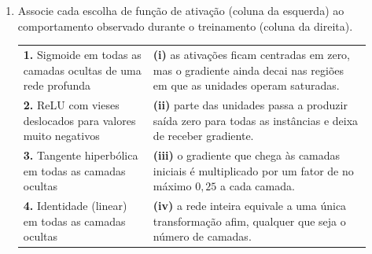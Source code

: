 \documentclass{dlproblemset}
\begin{document}
\begin{enumerate}[1)]
    \begin{enumerate}[(a)]
        \item $\mathcal{L} = \displaystyle\sum_{i=1}^{N} \left[ \bigl(y^{(i)} - \mu^{(i)}\bigr)^2 + \ln\bigl|\cos(y^{(i)} - \mu^{(i)})\bigr| \right]$
        \item $\mathcal{L} = \displaystyle\sum_{i=1}^{N} \left[ \bigl(y^{(i)} - \mu^{(i)}\bigr)^2 - \ln\bigl|\cos(y^{(i)} - \mu^{(i)})\bigr| \right]$
        \item $\mathcal{L} = \displaystyle\sum_{i=1}^{N} \left[ \frac{\bigl(y^{(i)} - \mu^{(i)}\bigr)^2}{2\sigma^2} - \ln\bigl|\cos(y^{(i)} - \mu^{(i)})\bigr| \right]$
        \item $\mathcal{L} = \displaystyle\sum_{i=1}^{N} \left[ -\bigl(y^{(i)} - \mu^{(i)}\bigr)^2 - \ln\bigl|\cos(y^{(i)} - \mu^{(i)})\bigr| \right]$
        \item $\mathcal{L} = \displaystyle\sum_{i=1}^{N} \left[ \bigl(y^{(i)} - \mu^{(i)}\bigr)^2 \cdot \ln\bigl|\cos(y^{(i)} - \mu^{(i)})\bigr| \right]$
        \item $\mathcal{L} = \displaystyle\sum_{i=1}^{N} \left[ \bigl(y^{(i)} - \mu^{(i)}\bigr)^2 - \bigl|\cos(y^{(i)} - \mu^{(i)})\bigr| \right]$
        \item $\mathcal{L} = \displaystyle\sum_{i=1}^{N} \left[ \bigl(y^{(i)} - \mu^{(i)}\bigr)^2 - \ln\bigl|\cos(\mu^{(i)})\bigr| \right]$
        \item $\mathcal{L} = -\displaystyle\sum_{i=1}^{N} \left[ \bigl(y^{(i)} - \mu^{(i)}\bigr)^2 - \ln\bigl|\cos(y^{(i)} - \mu^{(i)})\bigr| \right]$
    \end{enumerate}

    \item Associe cada escolha de função de ativação (coluna da esquerda) ao comportamento observado durante o treinamento (coluna da direita).

    \begin{center}
    \begin{tabular}{p{0.34\linewidth} p{0.58\linewidth}}
    \textbf{1.} Sigmoide em todas as camadas ocultas de uma rede profunda & \textbf{(i)} as ativações ficam centradas em zero, mas o gradiente ainda decai nas regiões em que as unidades operam saturadas. \\
    \textbf{2.} ReLU com vieses deslocados para valores muito negativos & \textbf{(ii)} parte das unidades passa a produzir saída zero para todas as instâncias e deixa de receber gradiente. \\
    \textbf{3.} Tangente hiperbólica em todas as camadas ocultas & \textbf{(iii)} o gradiente que chega às camadas iniciais é multiplicado por um fator de no máximo $0{,}25$ a cada camada. \\
    \textbf{4.} Identidade (linear) em todas as camadas ocultas & \textbf{(iv)} a rede inteira equivale a uma única transformação afim, qualquer que seja o número de camadas. \\
    \end{tabular}
    \end{center}


\end{enumerate}
\end{document}
